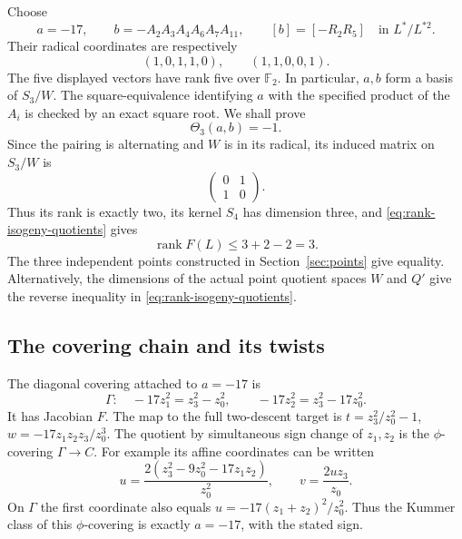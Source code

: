 \documentclass[11pt,a4paper]{article}
\theoremstyle{definition}\newtheorem{definition}[theorem]{Definition}
\theoremstyle{remark}\newtheorem{remark}[theorem]{Remark}
\begin{document}
Choose
\[
 a=-17,\qquad b=-A_2A_3A_4A_6A_7A_{11},\qquad
 [b]=[-R_2R_5]\quad\text{in }L^*/L^{*2}.
\]
Their radical coordinates are respectively
\[
 (1,0,1,1,0),\qquad(1,1,0,0,1).
\]
The five displayed vectors have rank five over $\mathbb F_2$.
In particular, $a,b$ form a basis of $S_3/W$.  The square-equivalence
identifying $a$ with the specified product of the $A_i$ is checked by
an exact square root.  We shall prove
\begin{equation}\label{eq:theta3-nonzero}
 \Theta_3(a,b)=-1.
\end{equation}
Since the pairing is alternating and $W$ is in its radical,
its induced matrix on $S_3/W$ is
\[
 \begin{pmatrix}0&1\\1&0\end{pmatrix}.
\]
Thus its rank is exactly two, its kernel $S_4$ has dimension three,
and \eqref{eq:rank-isogeny-quotients} gives
\begin{equation}\label{eq:higher-rank-three}
 \operatorname{rank}F(L)\leq 3+2-2=3.
\end{equation}
The three independent points constructed in Section~\ref{sec:points} give equality.
Alternatively, the dimensions of the actual point quotient spaces $W$ and $Q'$ give the reverse inequality in
\eqref{eq:rank-isogeny-quotients}.

\subsection{The covering chain and its twists}

The diagonal covering attached to $a=-17$ is
\[
 \Gamma:\quad -17z_1^2=z_3^2-z_0^2,\qquad
                    -17z_2^2=z_3^2-17z_0^2.
\]
It has Jacobian $F$.  The map to the full two-descent target is
$t=z_3^2/z_0^2-1$, $w=-17z_1z_2z_3/z_0^3$.
The quotient by simultaneous sign change of $z_1,z_2$ is the
$\phi$-covering $\Gamma\longrightarrow C$.  For example its affine
coordinates can be written
\[
 u=\frac{2(z_3^2-9z_0^2-17z_1z_2)}{z_0^2},\qquad
 v=\frac{2uz_3}{z_0}.
\]
On $\Gamma$ the first coordinate also equals
$u=-17(z_1+z_2)^2/z_0^2$.  Thus the Kummer class of this
$\phi$-covering is exactly $a=-17$, with the stated sign.
\end{document}
